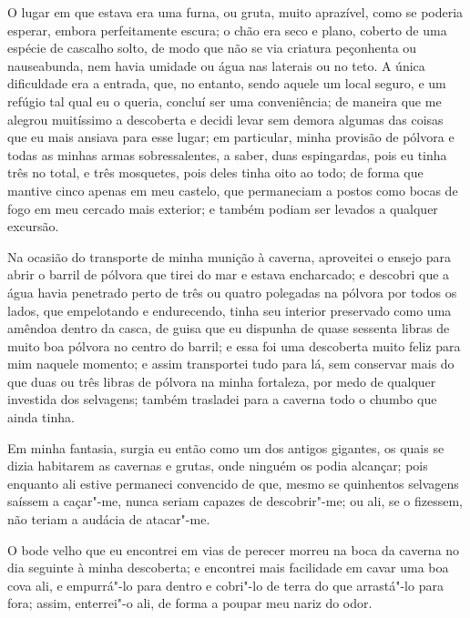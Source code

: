O lugar em que estava era uma furna, ou gruta, muito aprazível, como se
poderia esperar, embora perfeitamente escura; o chão era seco e plano,
coberto de uma espécie de cascalho solto, de modo que não se via
criatura peçonhenta ou nauseabunda, nem havia umidade ou água nas
laterais ou no teto. A única dificuldade era a entrada, que, no entanto,
sendo aquele um local seguro, e um refúgio tal qual eu o queria, concluí
ser uma conveniência; de maneira que me alegrou muitíssimo a descoberta
e decidi levar sem demora algumas das coisas que eu mais ansiava para
esse lugar; em particular, minha provisão de pólvora e todas as minhas
armas sobressalentes, a saber, duas espingardas, pois eu tinha três no
total, e três mosquetes, pois deles tinha oito ao todo; de forma que
mantive cinco apenas em meu castelo, que permaneciam a postos como bocas
de fogo em meu cercado mais exterior; e também podiam ser levados a
qualquer excursão.

Na ocasião do transporte de minha munição à caverna, aproveitei o ensejo
para abrir o barril de pólvora que tirei do mar e estava encharcado; e
descobri que a água havia penetrado perto de três ou quatro polegadas na
pólvora por todos os lados, que empelotando e endurecendo, tinha seu
interior preservado como uma amêndoa dentro da casca, de guisa que eu
dispunha de quase sessenta libras de muito boa pólvora no centro do
barril; e essa foi uma descoberta muito feliz para mim naquele momento;
e assim transportei tudo para lá, sem conservar mais do que duas ou três
libras de pólvora na minha fortaleza, por medo de qualquer investida dos
selvagens; também trasladei para a caverna todo o chumbo que ainda
tinha.

Em minha fantasia, surgia eu então como um dos antigos gigantes, os
quais se dizia habitarem as cavernas e grutas, onde ninguém os podia
alcançar; pois enquanto ali estive permaneci convencido de que, mesmo se
quinhentos selvagens saíssem a caçar"-me, nunca seriam capazes de
descobrir"-me; ou ali, se o fizessem, não teriam a audácia de atacar"-me.

O bode velho que eu encontrei em vias de perecer morreu na boca da
caverna no dia seguinte à minha descoberta; e encontrei mais facilidade
em cavar uma boa cova ali, e empurrá"-lo para dentro e cobri"-lo de terra
do que arrastá"-lo para fora; assim, enterrei"-o ali, de forma a poupar
meu nariz do odor.

